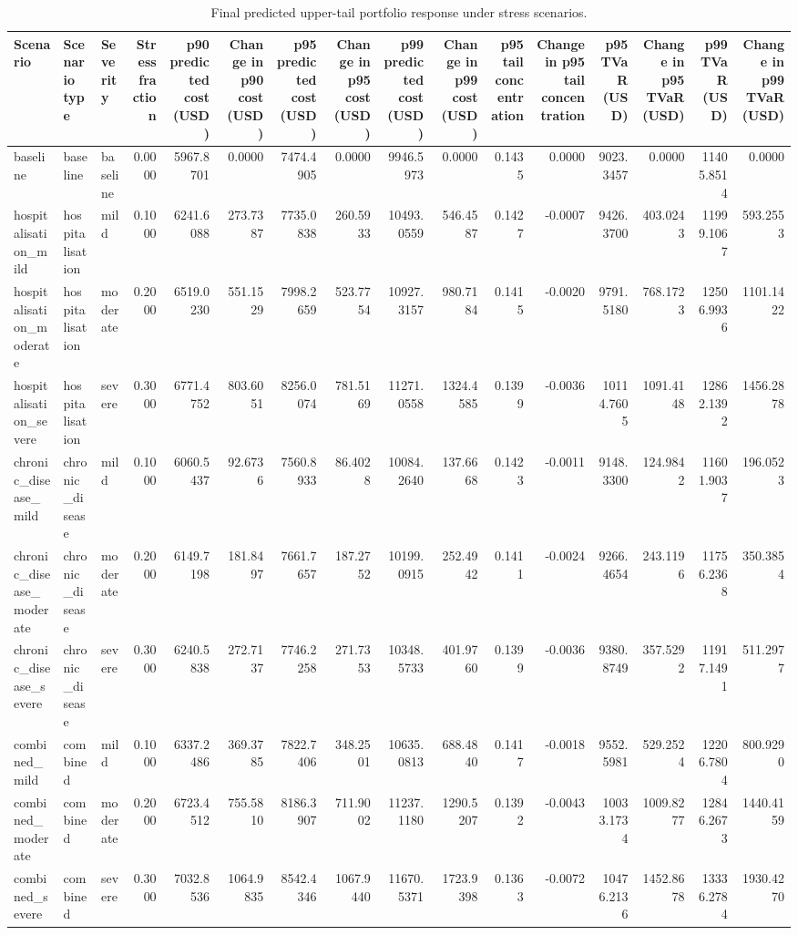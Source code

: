 \begin{table}
\caption{Final predicted upper-tail portfolio response under stress scenarios.}
\label{tab:09-final-stress-tail-response}
\begin{tabular}{lllrrrrrrrrrrrrr}
\toprule
Scenario & Scenario type & Severity & Stress fraction & p90 predicted cost (USD) & Change in p90 cost (USD) & p95 predicted cost (USD) & Change in p95 cost (USD) & p99 predicted cost (USD) & Change in p99 cost (USD) & p95 tail concentration & Change in p95 tail concentration & p95 TVaR (USD) & Change in p95 TVaR (USD) & p99 TVaR (USD) & Change in p99 TVaR (USD) \\
\midrule
baseline & baseline & baseline & 0.0000 & 5967.8701 & 0.0000 & 7474.4905 & 0.0000 & 9946.5973 & 0.0000 & 0.1435 & 0.0000 & 9023.3457 & 0.0000 & 11405.8514 & 0.0000 \\
hospitalisation_mild & hospitalisation & mild & 0.1000 & 6241.6088 & 273.7387 & 7735.0838 & 260.5933 & 10493.0559 & 546.4587 & 0.1427 & -0.0007 & 9426.3700 & 403.0243 & 11999.1067 & 593.2553 \\
hospitalisation_moderate & hospitalisation & moderate & 0.2000 & 6519.0230 & 551.1529 & 7998.2659 & 523.7754 & 10927.3157 & 980.7184 & 0.1415 & -0.0020 & 9791.5180 & 768.1723 & 12506.9936 & 1101.1422 \\
hospitalisation_severe & hospitalisation & severe & 0.3000 & 6771.4752 & 803.6051 & 8256.0074 & 781.5169 & 11271.0558 & 1324.4585 & 0.1399 & -0.0036 & 10114.7605 & 1091.4148 & 12862.1392 & 1456.2878 \\
chronic_disease_mild & chronic_disease & mild & 0.1000 & 6060.5437 & 92.6736 & 7560.8933 & 86.4028 & 10084.2640 & 137.6668 & 0.1423 & -0.0011 & 9148.3300 & 124.9842 & 11601.9037 & 196.0523 \\
chronic_disease_moderate & chronic_disease & moderate & 0.2000 & 6149.7198 & 181.8497 & 7661.7657 & 187.2752 & 10199.0915 & 252.4942 & 0.1411 & -0.0024 & 9266.4654 & 243.1196 & 11756.2368 & 350.3854 \\
chronic_disease_severe & chronic_disease & severe & 0.3000 & 6240.5838 & 272.7137 & 7746.2258 & 271.7353 & 10348.5733 & 401.9760 & 0.1399 & -0.0036 & 9380.8749 & 357.5292 & 11917.1491 & 511.2977 \\
combined_mild & combined & mild & 0.1000 & 6337.2486 & 369.3785 & 7822.7406 & 348.2501 & 10635.0813 & 688.4840 & 0.1417 & -0.0018 & 9552.5981 & 529.2524 & 12206.7804 & 800.9290 \\
combined_moderate & combined & moderate & 0.2000 & 6723.4512 & 755.5810 & 8186.3907 & 711.9002 & 11237.1180 & 1290.5207 & 0.1392 & -0.0043 & 10033.1734 & 1009.8277 & 12846.2673 & 1440.4159 \\
combined_severe & combined & severe & 0.3000 & 7032.8536 & 1064.9835 & 8542.4346 & 1067.9440 & 11670.5371 & 1723.9398 & 0.1363 & -0.0072 & 10476.2136 & 1452.8678 & 13336.2784 & 1930.4270 \\
\bottomrule
\end{tabular}
\end{table}
